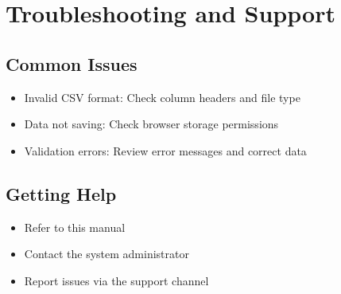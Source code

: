 \documentclass[12pt]{article}
\begin{document}
\section{Troubleshooting and Support}
\subsection{Common Issues}
\begin{itemize}
    \item Invalid CSV format: Check column headers and file type
    \item Data not saving: Check browser storage permissions
    \item Validation errors: Review error messages and correct data
\end{itemize}

\subsection{Getting Help}
\begin{itemize}
    \item Refer to this manual
    \item Contact the system administrator
    \item Report issues via the support channel
\end{itemize}
\end{document}
